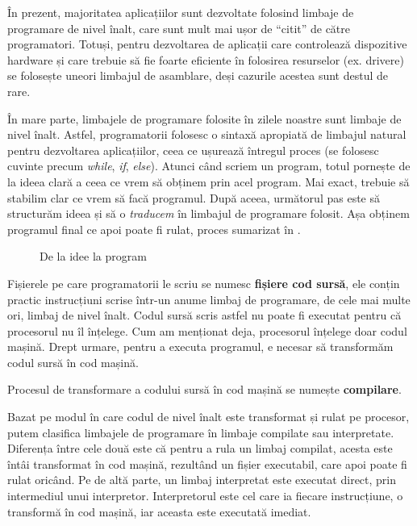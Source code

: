În prezent, majoritatea aplicațiilor sunt dezvoltate folosind limbaje de programare de nivel înalt, care sunt mult mai ușor de “citit” de către programatori.
Totuși, pentru dezvoltarea de aplicații care controlează dispozitive hardware și care trebuie să fie foarte eficiente în folosirea resurselor (ex. drivere) se folosește uneori limbajul de asamblare, deși cazurile acestea sunt destul de rare.

În mare parte, limbajele de programare folosite în zilele noastre sunt limbaje de nivel înalt.
Astfel, programatorii folosesc o sintaxă apropiată de limbajul natural pentru dezvoltarea aplicațiilor, ceea ce ușurează întregul proces (se folosesc cuvinte precum \textit{while}, \textit{if}, \textit{else}).
Atunci când scriem un program, totul pornește de la ideea clară a ceea ce vrem să obținem prin acel program.
Mai exact, trebuie să stabilim clar ce vrem să facă programul.
După aceea, următorul pas este să structurăm ideea și să o \textit{traducem} în limbajul de programare folosit.
Așa obținem programul final ce apoi poate fi rulat, proces sumarizat în .

\begin{figure}[htbp]
  \centering
  \def\svgwidth{\columnwidth}
  
  \caption{De la idee la program}
  \label{fig:appdev:idea-to-program}
\end{figure}

Fișierele pe care programatorii le scriu se numesc \textbf{fișiere cod sursă}, ele conțin practic instrucțiuni scrise într-un anume limbaj de programare, de cele mai multe ori, limbaj de nivel înalt.
Codul sursă scris astfel nu poate fi executat pentru că procesorul nu îl înțelege.
Cum am menționat deja, procesorul înțelege doar codul mașină.
Drept urmare, pentru a executa programul, e necesar să transformăm codul sursă în cod mașină.

Procesul de transformare a codului sursă în cod mașină se numește \textbf{compilare}.

Bazat pe modul în care codul de nivel înalt este transformat și rulat pe procesor, putem clasifica limbajele de programare în limbaje compilate sau interpretate.
Diferența între cele două este că pentru a rula un limbaj compilat, acesta este întâi transformat în cod mașină, rezultând un fișier executabil, care apoi poate fi rulat oricând.
Pe de altă parte, un limbaj interpretat este executat direct, prin intermediul unui interpretor.
Interpretorul este cel care ia fiecare instrucțiune, o transformă în cod mașină, iar aceasta este executată imediat.


